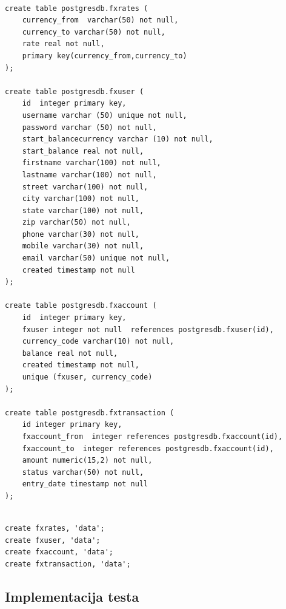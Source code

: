 \documentclass[12pt,oneside]{memoir}
\begin{document}

\begin{lstlisting}[title={setup-postgres-model.sql},captionpos=t]

create table postgresdb.fxrates (
	currency_from  varchar(50) not null,
	currency_to varchar(50) not null,
	rate real not null,
	primary key(currency_from,currency_to)
);

create table postgresdb.fxuser (
	id  integer primary key,
	username varchar (50) unique not null,
	password varchar (50) not null,
	start_balancecurrency varchar (10) not null,
	start_balance real not null,
	firstname varchar(100) not null,
	lastname varchar(100) not null,
	street varchar(100) not null,
	city varchar(100) not null,
	state varchar(100) not null,
	zip varchar(50) not null,
	phone varchar(30) not null,
	mobile varchar(30) not null,
	email varchar(50) unique not null,
	created timestamp not null
);

create table postgresdb.fxaccount (
	id  integer primary key,
	fxuser integer not null  references postgresdb.fxuser(id),
	currency_code varchar(10) not null,
	balance real not null,
	created timestamp not null,
	unique (fxuser, currency_code)
);

create table postgresdb.fxtransaction (
	id integer primary key,
	fxaccount_from  integer references postgresdb.fxaccount(id),
	fxaccount_to  integer references postgresdb.fxaccount(id),
	amount numeric(15,2) not null,
	status varchar(50) not null,
	entry_date timestamp not null
);


\end{lstlisting}


\begin{lstlisting}[title={setup-hbase-model.sh},captionpos=t]
create fxrates, 'data';
create fxuser, 'data';
create fxaccount, 'data';
create fxtransaction, 'data';
\end{lstlisting}

\subsection{Implementacija testa}
\end{document}
